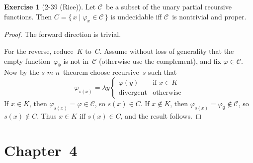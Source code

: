 \documentclass[letterpaper]{article}
\newcommand{\C}{\mathcal{C}}
\newcommand{\smn}{$s$-$m$-$n$}
\theoremstyle{definition}
\newtheorem*{exer}{Exercise}
\theoremstyle{remark}
\theoremstyle{direction}
\begin{document}
\begin{exer}[2-39 (Rice)]
Let $\C$~be a subset of the unary partial recursive functions. Then $C=\{\,x\mid\varphi_x\in\C\,\}$ is undecidable iff $\C$~is nontrivial and proper.
\end{exer}
\begin{proof}
The forward direction is trivial.

For the reverse, reduce~$K$ to~$C$. Assume without loss of generality that the empty function~$\varphi_{\emptyset}$ is not in~$\C$ (otherwise use the complement), and fix $\varphi\in\C$. Now by the \smn\ theorem choose recursive~$s$ such that
$$\varphi_{s(x)}=\lambda y\begin{cases}
\varphi(y)&\text{if }x\in K\\
\text{divergent}&\text{otherwise}
\end{cases}$$
If $x\in K$, then $\varphi_{s(x)}=\varphi\in\C$, so $s(x)\in C$. If $x\not\in K$, then $\varphi_{s(x)}=\varphi_{\emptyset}\not\in\C$, so $s(x)\not\in C$. Thus $x\in K$ iff $s(x)\in C$, and the result follows.
\end{proof}

\newpage
\section*{Chapter~4}
\end{document}
